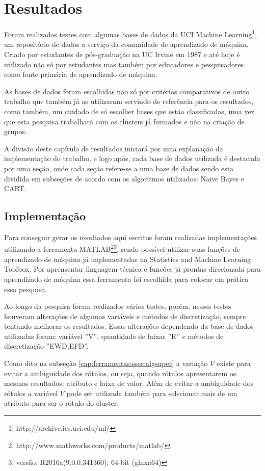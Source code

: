 \chapter{Resultados}\label{cap:resultados}

Foram realizados testes com algumas bases de dados da UCI Machine Learning\footnote{http://archive.ics.uci.edu/ml/}, um repositório de dados a serviço da comunidade de aprendizado de máquina. Criado por estudantes de pós-graduação na UC Irvine em 1987 e até hoje é utilizado não só por estudantes mas também por educadores e pesquisadores como fonte primária de aprendizado de máquina. 

As bases de dados foram escolhidas não só por critérios comparativos de outro trabalho que também já as utilizaram servindo  de referência para os resultados, como também, um cuidado de só escolher bases que estão classificadas, uma vez que esta pesquisa trabalhará com os clusters já formados e não na criação de grupos.

A divisão deste capítulo de resultados iniciará por uma explanação da implementação do trabalho, e logo após, cada base de dados utilizada é destacada por uma seção, onde cada seção refere-se a uma base de dados sendo esta dividida em subseções de acordo com os algoritmos utilizados: Naive Bayes e CART.

\section{Implementação}\label{cap:resultados:sec:implement}

Para conseguir gerar os resultados aqui escritos foram realizadas implementações utilizando a ferramenta MATLAB\footnote{http://www.mathworks.com/products/matlab/}\footnote{versão: R2016a(9.0.0.341360); 64-bit (glnxa64)}, sendo possível utilizar suas funções de aprendizado de máquina já implementadas na Statistics and Machine Learning Toolbox. Por aprensentar  linguagem técnica e funcões já prontas direcionada para aprendizado de máquina essa ferramenta foi escolhida para colocar em prática essa pesquisa.

Ao longo da pesquisa foram realizados vários testes, porém, nesses testes houveram alterações de algumas variáveis e métodos de discretização, sempre tentando melhorar os resultados. Essas alterações dependendo da base de dados utilizadas foram: variável ''V'', quantidade de faixas ''R'' e métodos de discretização ''EWD,EFD''. 

Como dito na subseção \ref{cap:ferramentas:ssec:algsuper} a variação ${V}$ existe para evitar a ambiguidade dos rótulos, ou seja, quando rótulos apresentarem os mesmos resultados: atributo e faixa de valor. Além de evitar a ambiguidade dos rótulos a variável ${V}$ pode ser utilizada também para selecionar mais de um atributo para ser o rótulo do cluster.

